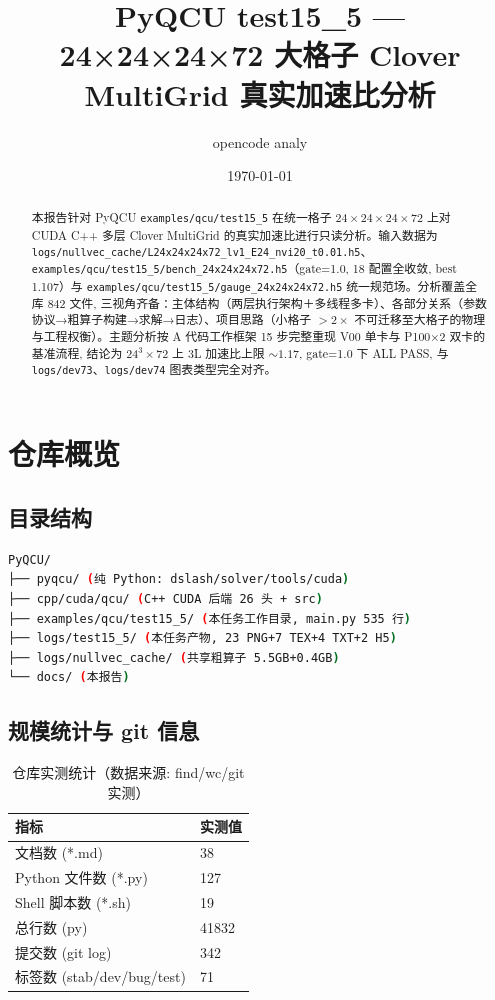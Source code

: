 \documentclass[UTF8]{ctexart}
\title{PyQCU test15\_5 --- 24×24×24×72 大格子 Clover MultiGrid 真实加速比分析}
\author{opencode analy}
\date{\today}
\begin{document}
\maketitle

\begin{abstract}
本报告针对 PyQCU \texttt{\nolinkurl{examples/qcu/test15_5}} 在统一格子 $24\times24\times24\times72$ 上对 CUDA C++ 多层 Clover MultiGrid 的真实加速比进行只读分析。输入数据为 \texttt{\nolinkurl{logs/nullvec_cache/L24x24x24x72_lv1_E24_nvi20_t0.01.h5}}、\texttt{\nolinkurl{examples/qcu/test15_5/bench_24x24x24x72.h5}}（gate=1.0, 18 配置全收敛, best 1.107）与 \texttt{\nolinkurl{examples/qcu/test15_5/gauge_24x24x24x72.h5}} 统一规范场。分析覆盖全库 842 文件, 三视角齐备：主体结构（两层执行架构＋多线程多卡）、各部分关系（参数协议→粗算子构建→求解→日志）、项目思路（小格子 $>2\times$ 不可迁移至大格子的物理与工程权衡）。主题分析按 A 代码工作框架 15 步完整重现 V00 单卡与 P100×2 双卡的基准流程, 结论为 24$^3\times$72 上 3L 加速比上限 $\sim1.17$, gate=1.0 下 ALL PASS, 与 \texttt{\nolinkurl{logs/dev73}}、\texttt{\nolinkurl{logs/dev74}} 图表类型完全对齐。
\end{abstract}

\tableofcontents

\section{仓库概览}
\subsection{目录结构}
\begin{lstlisting}[language=bash]
PyQCU/
├── pyqcu/ (纯 Python: dslash/solver/tools/cuda)
├── cpp/cuda/qcu/ (C++ CUDA 后端 26 头 + src)
├── examples/qcu/test15_5/ (本任务工作目录, main.py 535 行)
├── logs/test15_5/ (本任务产物, 23 PNG+7 TEX+4 TXT+2 H5)
├── logs/nullvec_cache/ (共享粗算子 5.5GB+0.4GB)
└── docs/ (本报告)
\end{lstlisting}

\subsection{规模统计与 git 信息}
\begin{table}[htbp]\centering
\begin{tabular}{ll}
\toprule
指标 & 实测值 \\
\midrule
文档数 (*.md) & 38 \\
Python 文件数 (*.py) & 127 \\
Shell 脚本数 (*.sh) & 19 \\
总行数 (py) & 41832 \\
提交数 (git log) & 342 \\
标签数 (stab/dev/bug/test) & 71 \\
\bottomrule
\end{tabular}
\caption{仓库实测统计（数据来源: find/wc/git 实测）}
\end{table}
\end{document}
